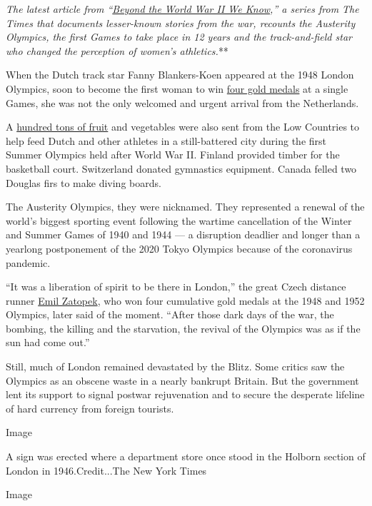 \emph{\emph{\emph{The latest article from
``}\href{https://www.nytimes3xbfgragh.onion/spotlight/beyond-wwii}{\emph{Beyond
the World War II We Know}}},'' a series from The Times that documents
lesser-known stories from the war, recounts the Austerity Olympics, the
first Games to take place in 12 years and the track-and-field star who
changed the perception of women's athletics.}**

When the Dutch track star Fanny Blankers-Koen appeared at the 1948
London Olympics, soon to become the first woman to win
\href{https://www.youtube.com/watch?v=_Y_G0H-b3QE}{four gold medals} at
a single Games, she was not the only welcomed and urgent arrival from
the Netherlands.

A
\href{https://www.olympic.org/news/london-1948-only-two-years-to-prepare-and-huge-challenges}{hundred
tons of fruit} and vegetables were also sent from the Low Countries to
help feed Dutch and other athletes in a still-battered city during the
first Summer Olympics held after World War II. Finland provided timber
for the basketball court. Switzerland donated gymnastics equipment.
Canada felled two Douglas firs to make diving boards.

The Austerity Olympics, they were nicknamed. They represented a renewal
of the world's biggest sporting event following the wartime cancellation
of the Winter and Summer Games of 1940 and 1944 --- a disruption
deadlier and longer than a yearlong postponement of the 2020 Tokyo
Olympics because of the coronavirus pandemic.

``It was a liberation of spirit to be there in London,'' the great Czech
distance runner
\href{https://www.lrb.co.uk/the-paper/v38/n19/jon-day/hang-up-your-running-shoes}{Emil
Zatopek}, who won four cumulative gold medals at the 1948 and 1952
Olympics, later said of the moment. ``After those dark days of the war,
the bombing, the killing and the starvation, the revival of the Olympics
was as if the sun had come out.''

Still, much of London remained devastated by the Blitz. Some critics saw
the Olympics as an obscene waste in a nearly bankrupt Britain. But the
government lent its support to signal postwar rejuvenation and to secure
the desperate lifeline of hard currency from foreign tourists.

Image

A sign was erected where a department store once stood in the Holborn
section of London in 1946.Credit...The New York Times

Image

